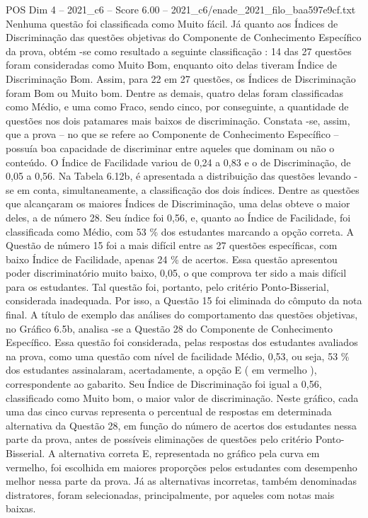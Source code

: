\begin{textsample}{POS Dim 4 – 2021\_c6 – Score 6.00 – 2021\_c6/enade\_2021\_filo\_baa597e9cf.txt}
Nenhuma questão foi classificada como Muito fácil.
Já quanto aos Índices de Discriminação das questões objetivas do Componente de Conhecimento Específico da prova, obtém -se como resultado a seguinte classificação : 14 das 27 questões foram consideradas como Muito Bom, enquanto oito delas tiveram Índice de Discriminação Bom.
Assim, para 22 em 27 questões, os Índices de Discriminação foram Bom ou Muito bom.
Dentre as demais, quatro delas foram classificadas como Médio, e uma como Fraco, sendo cinco, por conseguinte, a quantidade de questões nos dois patamares mais baixos de discriminação.
Constata -se, assim, que a prova – no que se refere ao Componente de Conhecimento Específico – possuía boa capacidade de discriminar entre aqueles que dominam ou não o conteúdo.
O Índice de Facilidade variou de 0,24 a 0,83 e o de Discriminação, de 0,05 a 0,56.
Na Tabela 6.12b, é apresentada a distribuição das questões levando -se em conta, simultaneamente, a classificação dos dois índices.
Dentre as questões que alcançaram os maiores Índices de Discriminação, uma delas obteve o maior deles, a de número 28.
Seu índice foi 0,56, e, quanto ao Índice de Facilidade, foi classificada como Médio, com 53 \% dos estudantes marcando a opção correta.
A Questão de número 15 foi a mais difícil entre as 27 questões específicas, com baixo Índice de Facilidade, apenas 24 \% de acertos.
Essa questão apresentou poder discriminatório muito baixo, 0,05, o que comprova ter sido a mais difícil para os estudantes.
Tal questão foi, portanto, pelo critério Ponto-Bisserial, considerada inadequada.
Por isso, a Questão 15 foi eliminada do cômputo da nota final.
A título de exemplo das análises do comportamento das questões objetivas, no Gráfico 6.5b, analisa -se a Questão 28 do Componente de Conhecimento Específico.
Essa questão foi considerada, pelas respostas dos estudantes avaliados na prova, como uma questão com nível de facilidade Médio, 0,53, ou seja, 53 \% dos estudantes assinalaram, acertadamente, a opção E ( em vermelho ), correspondente ao gabarito.
Seu Índice de Discriminação foi igual a 0,56, classificado como Muito bom, o maior valor de discriminação.
Neste gráfico, cada uma das cinco curvas representa o percentual de respostas em determinada alternativa da Questão 28, em função do número de acertos dos estudantes nessa parte da prova, antes de possíveis eliminações de questões pelo critério Ponto-Bisserial.
A alternativa correta E, representada no gráfico pela curva em vermelho, foi escolhida em maiores proporções pelos estudantes com desempenho melhor nessa parte da prova.
Já as alternativas incorretas, também denominadas distratores, foram selecionadas, principalmente, por aqueles com notas mais baixas.

\end{textsample}
